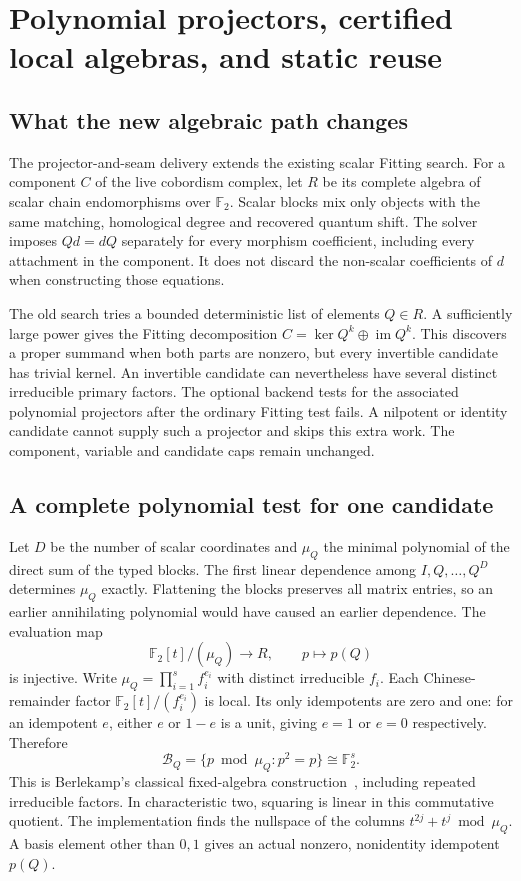 \section{Polynomial projectors, certified local algebras, and static reuse}
\label{sec:primary-continuation}

\subsection{What the new algebraic path changes}
The projector-and-seam delivery extends the existing scalar Fitting search.
For a component $C$ of the live cobordism complex, let $R$ be its complete
algebra of scalar chain endomorphisms over $\mathbb F_2$. Scalar blocks mix
only objects with the same matching, homological degree and recovered quantum
shift. The solver imposes $Qd=dQ$ separately for every morphism coefficient,
including every attachment in the component. It does not discard the
non-scalar coefficients of $d$ when constructing those equations.

The old search tries a bounded deterministic list of elements $Q\in R$.
A sufficiently large power gives the Fitting decomposition
$C=\ker Q^k\oplus\operatorname{im}Q^k$. This discovers a proper summand when
both parts are nonzero, but every invertible candidate has trivial kernel.
An invertible candidate can nevertheless have several distinct irreducible
primary factors. The optional  backend tests for the associated
polynomial projectors after the ordinary Fitting test fails. A nilpotent or
identity candidate cannot supply such a projector and skips this extra work.
The component, variable and candidate caps remain unchanged.

\subsection{A complete polynomial test for one candidate}
Let $D$ be the number of scalar coordinates and $\mu_Q$ the minimal polynomial
of the direct sum of the typed blocks. The first linear dependence among
$I,Q,\ldots,Q^D$ determines $\mu_Q$ exactly. Flattening the blocks preserves
all matrix entries, so an earlier annihilating polynomial would have caused
an earlier dependence. The evaluation map
\[
 \mathbb F_2[t]/(\mu_Q)\longrightarrow R,\qquad p\longmapsto p(Q)
\]
is injective. Write $\mu_Q=\prod_{i=1}^s f_i^{e_i}$ with distinct irreducible
$f_i$. Each Chinese-remainder factor $\mathbb F_2[t]/(f_i^{e_i})$ is local.
Its only idempotents are zero and one: for an idempotent $e$, either $e$ or
$1-e$ is a unit, giving $e=1$ or $e=0$ respectively. Therefore
\[
 \mathcal B_Q=\{p\bmod\mu_Q:p^2=p\}
 \cong\mathbb F_2^s.
\]
This is Berlekamp's classical fixed-algebra construction~\cite{berlekamp-primary},
including repeated irreducible factors. In characteristic two, squaring is
linear in this commutative quotient. The implementation finds the nullspace
of the columns $t^{2j}+t^j\bmod\mu_Q$. A basis element other than $0,1$ gives
an actual nonzero, nonidentity idempotent $p(Q)$.

